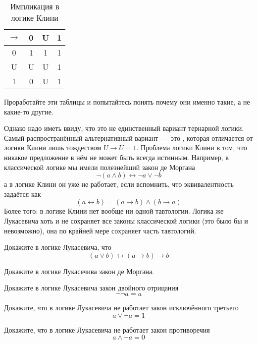 \begin{table}[h]
\centering
\begin{tabular}{c | c c c}
$\to$ & 0& U& 1 \\
\hline
0 & 1 & 1 & 1 \\
U & U & U & 1\\
1 & 0 & U & 1
\end{tabular}
\caption{Импликация в логике Клини}\label{table:kleene-or}
\end{table}

Проработайте эти таблицы и попытайтесь понять почему они именно такие, а не какие-то другие.

Однако надо иметь ввиду, что это не единственный вариант тернарной логики. Самый распространённый альтернативный вариант~--- это , которая отличается от логики Клини лишь тождеством $U\to U = 1$. Проблема логики Клини в том, что никакое предложение в нём не может быть всегда истинным. Например, в классической логике мы имели полезнейший закон де Моргана
$$\neg(a \land b) \leftrightarrow \neg a \lor \neg b$$
а в логике Клини он уже не работает, если вспомнить, что эквивалентность задаётся как
$$(a \leftrightarrow b) = (a\to b)\land (b\to a)$$
Более того: в логике Клини нет вообще ни одной тавтологии. Логика же Лукасевича хоть и не сохраняет все законы классической логики (это было бы и невозможно), она по крайней мере сохраняет часть тавтологий.

\begin{exercise}
Докажите в логике Лукасевича, что
$$(a\lor b) \leftrightarrow (a \to b) \to b$$
\end{exercise}

\begin{exercise}
Докажите в логике Лукасечива закон де Моргана.
\end{exercise}

\begin{exercise}
Докажите в логике Лукасевича закон двойного отрицания
$$\neg\neg a = a$$
\end{exercise}

\begin{exercise}
Докажите, что в логике Лукасевича не работает закон исключённого третьего
$$a\lor \neg a = 1$$
\end{exercise}

\begin{exercise}
Докажите, что в логике Лукасевича не работает закон противоречия
$$a\land \neg a = 0$$
\end{exercise}

